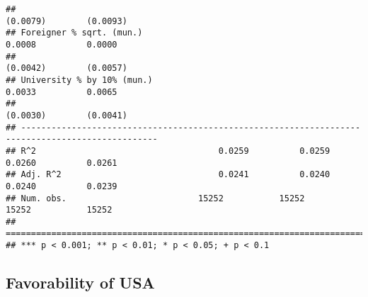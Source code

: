 \documentclass[
]{article}
\begin{document}
\begin{verbatim}
##                                                                       (0.0079)        (0.0093)   
## Foreigner % sqrt. (mun.)                                               0.0008          0.0000    
##                                                                       (0.0042)        (0.0057)   
## University % by 10% (mun.)                                             0.0033          0.0065    
##                                                                       (0.0030)        (0.0041)   
## -------------------------------------------------------------------------------------------------
## R^2                                    0.0259          0.0259          0.0260          0.0261    
## Adj. R^2                               0.0241          0.0240          0.0240          0.0239    
## Num. obs.                          15252           15252           15252           15252         
## =================================================================================================
## *** p < 0.001; ** p < 0.01; * p < 0.05; + p < 0.1
\end{verbatim}

\hypertarget{favorability-of-usa-1}{%
\subsection{Favorability of USA}\label{favorability-of-usa-1}}
\end{document}
